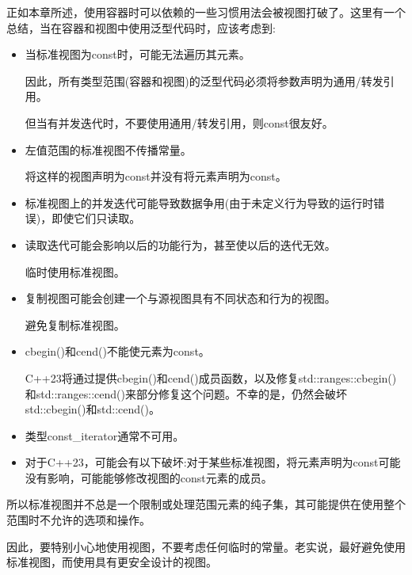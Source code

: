正如本章所述，使用容器时可以依赖的一些习惯用法会被视图打破了。这里有一个总结，当在容器和视图中使用泛型代码时，应该考虑到:

\begin{itemize}
\item
当标准视图为const时，可能无法遍历其元素。

因此，所有类型范围(容器和视图)的泛型代码必须将参数声明为通用/转发引用。

但当有并发迭代时，不要使用通用/转发引用，则const很友好。

\item
左值范围的标准视图不传播常量。

将这样的视图声明为const并没有将元素声明为const。

\item
标准视图上的并发迭代可能导致数据争用(由于未定义行为导致的运行时错误)，即使它们只读取。

\item
读取迭代可能会影响以后的功能行为，甚至使以后的迭代无效。

临时使用标准视图。

\item
复制视图可能会创建一个与源视图具有不同状态和行为的视图。

避免复制标准视图。

\item
cbegin()和cend()不能使元素为const。

C++23将通过提供cbegin()和cend()成员函数，以及修复std::ranges::cbegin()和std::ranges::cend()来部分修复这个问题。不幸的是，仍然会破坏std::cbegin()和std::cend()。

\item
类型const\_iterator通常不可用。

\item
对于C++23，可能会有以下破坏:对于某些标准视图，将元素声明为const可能没有影响，可能能够修改视图的const元素的成员。
\end{itemize}

所以标准视图并不总是一个限制或处理范围元素的纯子集，其可能提供在使用整个范围时不允许的选项和操作。

因此，要特别小心地使用视图，不要考虑任何临时的常量。老实说，最好避免使用标准视图，而使用具有更安全设计的视图。